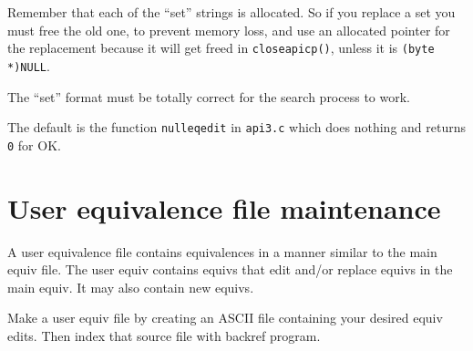 Remember that each of the ``set'' strings is allocated.  So if you
replace a set you must free the old one, to prevent memory loss,
and use an allocated pointer for the replacement because it will
get freed in \verb`closeapicp()`, unless it is \verb`(byte *)NULL`.

The ``set'' format must be totally correct for the search process to
work.

The default is the function \verb`nulleqedit` in \verb`api3.c` which does
nothing and returns \verb`0` for OK.

\section{User equivalence file maintenance}

A user equivalence file contains equivalences in a manner similar
to the main equiv file.  The user equiv contains equivs that edit
and/or replace equivs in the main equiv.  It may also contain new
equivs.

Make a user equiv file by creating an ASCII file containing your
desired equiv edits.  Then index that source file with backref
program.

